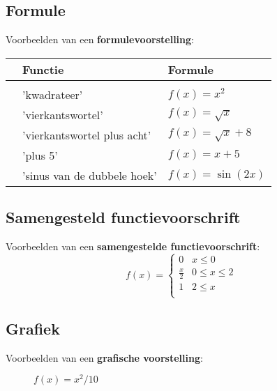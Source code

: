 \documentclass{ximera}
\begin{document}
\subsection{Formule}
Voorbeelden van een \textbf{formulevoorstelling}:


\begin{tabular}[t]{l l l}
	& Functie   &  Formule \\
	\hline \\
    & 'kwadrateer'                & $f(x) = x^2$ \\
	& 'vierkantswortel'           & $f(x) = \sqrt{x}$ \\
	& 'vierkantswortel plus acht' & $f(x) = \sqrt{x} + 8$ \\
	& 'plus 5'                    & $f(x) = x + 5$ \\
	& 'sinus van de dubbele hoek' & $f(x) = \sin(2x)$ \\
\end{tabular}


\subsection{Samengesteld functievoorschrift}
Voorbeelden van een \textbf{samengestelde functievoorschrift}:
\[  f(x) =  \left\{
\begin{array}{ll}
0 & x\leq 0 \\
\frac{x}{2} & 0 \leq x\leq 2 \\
1 & 2\leq x \\
\end{array} 
\right. \]


\subsection{Grafiek}
Voorbeelden van een \textbf{grafische voorstelling}:


\begin{figure}%
	\centering
	\begin{minipage}{0.45\textwidth}
		\centering



		\caption{$f(x) = x + 5$}
	\end{minipage}\hfill
	\begin{minipage}{0.45\textwidth}
		\centering


		\caption{$f(x) = x^2/10$}
	\end{minipage}
\end{figure}
\end{document}
